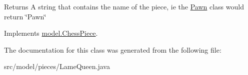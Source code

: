 \begin{DoxyReturn}{Returns}
A string that contains the name of the piece, ie the \hyperlink{classmodel_1_1pieces_1_1_pawn}{Pawn} class would return \char`\"{}\-Pawn\char`\"{} 
\end{DoxyReturn}


Implements \hyperlink{classmodel_1_1_chess_piece_a68308e2fa0fe868f7386d40c6cd925df}{model.\-Chess\-Piece}.



The documentation for this class was generated from the following file\-:\begin{DoxyCompactItemize}
\item 
src/model/pieces/Lame\-Queen.\-java\end{DoxyCompactItemize}
